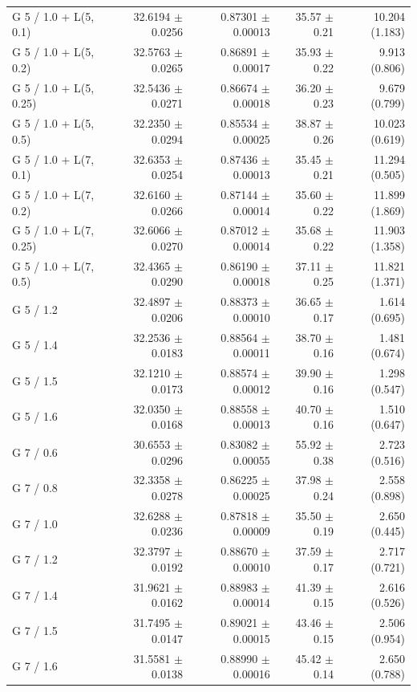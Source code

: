 \begin{longtable}{lrrrr}
G 5 / 1.0 + L(5, 0.1) & 32.6194 $\pm$ 0.0256 & 0.87301 $\pm$ 0.00013 & 35.57 $\pm$ 0.21 & 10.204 (1.183) \\
G 5 / 1.0 + L(5, 0.2) & 32.5763 $\pm$ 0.0265 & 0.86891 $\pm$ 0.00017 & 35.93 $\pm$ 0.22 & 9.913 (0.806) \\
G 5 / 1.0 + L(5, 0.25) & 32.5436 $\pm$ 0.0271 & 0.86674 $\pm$ 0.00018 & 36.20 $\pm$ 0.23 & 9.679 (0.799) \\
G 5 / 1.0 + L(5, 0.5) & 32.2350 $\pm$ 0.0294 & 0.85534 $\pm$ 0.00025 & 38.87 $\pm$ 0.26 & 10.023 (0.619) \\
G 5 / 1.0 + L(7, 0.1) & 32.6353 $\pm$ 0.0254 & 0.87436 $\pm$ 0.00013 & 35.45 $\pm$ 0.21 & 11.294 (0.505) \\
G 5 / 1.0 + L(7, 0.2) & 32.6160 $\pm$ 0.0266 & 0.87144 $\pm$ 0.00014 & 35.60 $\pm$ 0.22 & 11.899 (1.869) \\
G 5 / 1.0 + L(7, 0.25) & 32.6066 $\pm$ 0.0270 & 0.87012 $\pm$ 0.00014 & 35.68 $\pm$ 0.22 & 11.903 (1.358) \\
G 5 / 1.0 + L(7, 0.5) & 32.4365 $\pm$ 0.0290 & 0.86190 $\pm$ 0.00018 & 37.11 $\pm$ 0.25 & 11.821 (1.371) \\
G 5 / 1.2 & 32.4897 $\pm$ 0.0206 & 0.88373 $\pm$ 0.00010 & 36.65 $\pm$ 0.17 & 1.614 (0.695) \\
G 5 / 1.4 & 32.2536 $\pm$ 0.0183 & 0.88564 $\pm$ 0.00011 & 38.70 $\pm$ 0.16 & 1.481 (0.674) \\
G 5 / 1.5 & 32.1210 $\pm$ 0.0173 & 0.88574 $\pm$ 0.00012 & 39.90 $\pm$ 0.16 & 1.298 (0.547) \\
G 5 / 1.6 & 32.0350 $\pm$ 0.0168 & 0.88558 $\pm$ 0.00013 & 40.70 $\pm$ 0.16 & 1.510 (0.647) \\
G 7 / 0.6 & 30.6553 $\pm$ 0.0296 & 0.83082 $\pm$ 0.00055 & 55.92 $\pm$ 0.38 & 2.723 (0.516) \\
G 7 / 0.8 & 32.3358 $\pm$ 0.0278 & 0.86225 $\pm$ 0.00025 & 37.98 $\pm$ 0.24 & 2.558 (0.898) \\
G 7 / 1.0 & 32.6288 $\pm$ 0.0236 & 0.87818 $\pm$ 0.00009 & 35.50 $\pm$ 0.19 & 2.650 (0.445) \\
G 7 / 1.2 & 32.3797 $\pm$ 0.0192 & 0.88670 $\pm$ 0.00010 & 37.59 $\pm$ 0.17 & 2.717 (0.721) \\
G 7 / 1.4 & 31.9621 $\pm$ 0.0162 & 0.88983 $\pm$ 0.00014 & 41.39 $\pm$ 0.15 & 2.616 (0.526) \\
G 7 / 1.5 & 31.7495 $\pm$ 0.0147 & 0.89021 $\pm$ 0.00015 & 43.46 $\pm$ 0.15 & 2.506 (0.954) \\
G 7 / 1.6 & 31.5581 $\pm$ 0.0138 & 0.88990 $\pm$ 0.00016 & 45.42 $\pm$ 0.14 & 2.650 (0.788) \\

\end{longtable}
